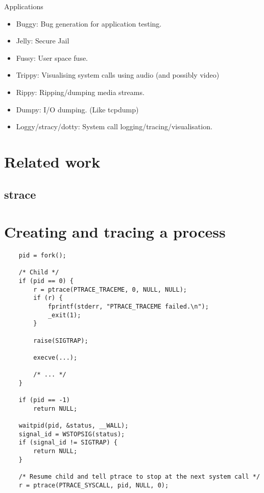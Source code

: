 \documentclass[a4paper, twoside, 10pt]{report}
\begin{document}
Applications
\begin{itemize}
    \item Buggy: Bug generation for application testing.
    \item Jelly: Secure Jail
    \item Fussy: User space fuse.
    \item Trippy: Visualising system calls using audio (and possibly video)
    \item Rippy: Ripping/dumping media streams.
    \item Dumpy: I/O dumping. (Like tcpdump)
    \item Loggy/stracy/dotty: System call logging/tracing/visualisation.
\end{itemize}


\chapter{Related work}

\section{strace}




\pagebreak

\appendix
\addappheadtotoc

\chapter{Creating and tracing a process}
\label{appendix:createtrace}

\begin{lstlisting}
    pid = fork();

    /* Child */
    if (pid == 0) {
        r = ptrace(PTRACE_TRACEME, 0, NULL, NULL);
        if (r) {
            fprintf(stderr, "PTRACE_TRACEME failed.\n");
            _exit(1);
        }

        raise(SIGTRAP);

        execve(...);

        /* ... */
    }

    if (pid == -1)
        return NULL;

    waitpid(pid, &status, __WALL);
    signal_id = WSTOPSIG(status);
    if (signal_id != SIGTRAP) {
        return NULL;
    }

    /* Resume child and tell ptrace to stop at the next system call */
    r = ptrace(PTRACE_SYSCALL, pid, NULL, 0);
\end{lstlisting}
\end{document}
